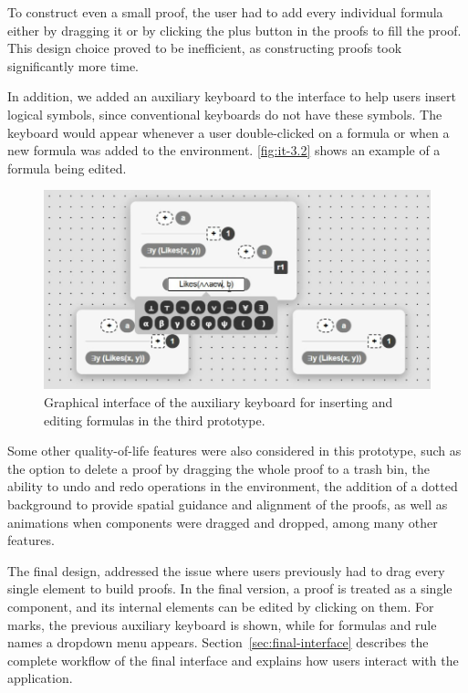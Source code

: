 To construct even a small proof, the user had to add every individual formula either by dragging it or by clicking the plus button in the proofs to fill the proof. This design choice proved to be inefficient, as constructing proofs took significantly more time.

In addition, we added an auxiliary keyboard to the interface to help users insert logical symbols, since conventional keyboards do not have these symbols. The keyboard would appear whenever a user double-clicked on a formula or when a new formula was added to the environment. \autoref{fig:it-3.2} shows an example of a formula being edited.

\begin{figure}[h]
    \centering
    \includegraphics[width=0.95\linewidth]{Chapters/Figures/image2.png}
    \caption{Graphical interface of the auxiliary keyboard for inserting and editing formulas in the third prototype.}
    \label{fig:it-3.2}
\end{figure}

Some other quality-of-life features were also considered in this prototype, such as the option to delete a proof by dragging the whole proof to a trash bin, the ability to undo and redo operations in the environment, the addition of a dotted background to provide spatial guidance and alignment of the proofs, as well as animations when components were dragged and dropped, among many other features.

The final design, addressed the issue where users previously had to drag every single element to build proofs. In the final version, a proof is treated as a single component, and its internal elements can be edited by clicking on them. For marks, the previous auxiliary keyboard is shown, while for formulas and rule names a dropdown menu appears. Section~\ref{sec:final-interface} describes the complete workflow of the final interface and explains how users interact with the application.

